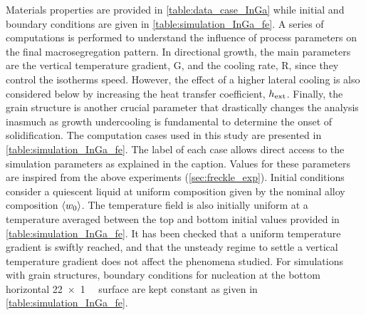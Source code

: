 %
Materials properties are provided in \cref{table:data_case_InGa} while initial and boundary conditions are given in \cref{table:simulation_InGa_fe}. 
A series of computations is performed to understand the influence of process parameters on the final macrosegregation pattern. 
In directional growth, the main parameters are the vertical temperature gradient, G, and the cooling rate, R, since they control the isotherms 
speed. However, the effect of a higher lateral cooling is also considered below by increasing the heat transfer coefficient,
$h_{\text{ext}}$. Finally, the grain structure is another crucial parameter that drastically changes the analysis inasmuch as growth 
undercooling is fundamental to determine the onset of solidification. The computation cases used in this study are presented 
in \cref{table:simulation_InGa_fe}. The label of each case allows direct access to the simulation parameters as explained in the caption. Values for 
these parameters are inspired from the above experiments (\cref{sec:freckle_exp}). Initial conditions consider a quiescent 
liquid at uniform composition given by the nominal alloy composition $\langle {w}_0 \rangle$. The temperature field is also initially uniform 
at a temperature averaged between the top and bottom initial values provided in \cref{table:simulation_InGa_fe}. It has been checked that a uniform 
temperature gradient is swiftly reached, and that the unsteady regime to settle a vertical temperature gradient does not affect 
the phenomena studied. For simulations with grain structures, boundary conditions for nucleation at the bottom horizontal \SI{22 x 1}{\milli \uarea} 
surface are kept constant as given in \cref{table:simulation_InGa_fe}.


